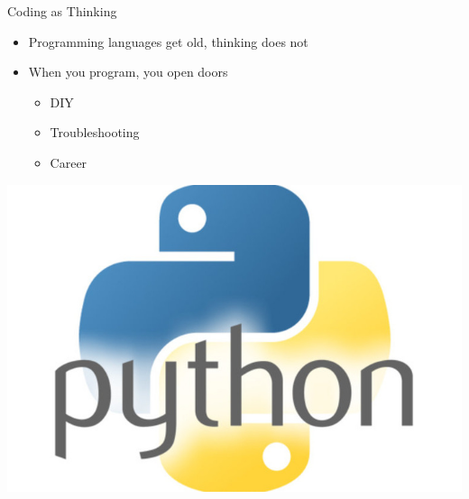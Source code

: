 \documentclass{beamer}
\begin{document}
\begin{frame}{Coding as Thinking}
    \begin{itemize}
        \item Programming languages get old, thinking does not
        \item When you program, you open doors
        \begin{itemize}
          \item DIY
          \item Troubleshooting
          \item Career
        \end{itemize}
    \end{itemize}
\end{frame}

\begin{frame}[plain]
    \includegraphics[width=\textwidth]{img/python-logo.jpg}
\end{frame}



    
\end{document}
